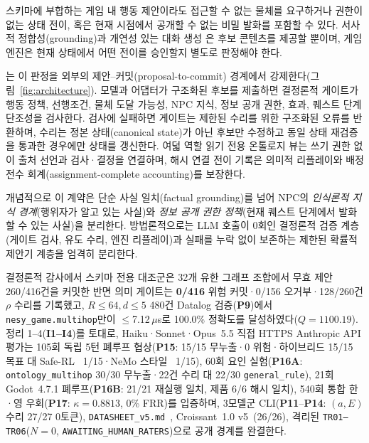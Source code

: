 스키마에 부합하는 게임 내 행동 제안이라도 접근할 수 없는 물체를 요구하거나 권한이 없는 상태 전이, 혹은 현재 시점에서 공개할 수 없는 비밀 발화를 포함할 수 있다. 서사적 정합성(grounding)과 개연성 있는 대화 생성 \cite{S03_weir2024ontologically,S20_ashby2023personalized}은 후보 콘텐츠를 제공할 뿐이며, 게임 엔진은 현재 상태에서 어떤 전이를 승인할지 별도로 판정해야 한다.

\system{}는 이 판정을 외부의 제안--커밋(proposal-to-commit) 경계에서 강제한다(그림~\ref{fig:architecture}). 모델과 어댑터가 구조화된 후보를 제출하면 결정론적 게이트가 행동 정책, 선행조건, 물체 도달 가능성, NPC 지식, 정보 공개 권한, 효과, 퀘스트 단계 단조성을 검사한다. 검사에 실패하면 게이트는 제한된 수리를 위한 구조화된 오류를 반환하며, 수리는 정본 상태(canonical state)가 아닌 후보만 수정하고 동일 상태 재검증을 통과한 경우에만 상태를 갱신한다. 여덟 역할 읽기 전용 온톨로지 뷰는 쓰기 권한 없이 출처 선언과 검사·결정을 연결하며, 해시 연결 전이 기록은 의미적 리플레이와 배정 전수 회계(assignment-complete accounting)를 보장한다.

개념적으로 이 계약은 단순 사실 일치(factual grounding)를 넘어 NPC의 \emph{인식론적 지식 경계}(행위자가 알고 있는 사실)와 \emph{정보 공개 권한 정책}(현재 퀘스트 단계에서 발화할 수 있는 사실)을 분리한다. 방법론적으로는 LLM 호출이 0회인 결정론적 검증 계층(게이트 검사, 유도 수리, 엔진 리플레이)과 실패를 누락 없이 보존하는 제한된 확률적 제안기 계층을 엄격히 분리한다.

결정론적 감사에서 스키마 전용 대조군은 32개 유한 그래프 조합에서 무효 제안 260/416건을 커밋한 반면 의미 게이트는 \textbf{0/416} 위험 커밋·0/156 오거부·128/260건 $\rho$ 수리를 기록했고, $R{\le}64, d{\le}5$ 480건 Datalog 검증(\textbf{P9})에서 \texttt{nesy\_game.multihop}만이 $\le$7.12\,$\mu$s로 100.0\% 정확도를 달성하였다($Q{=}1100.19$). 정리 1--4(\textbf{I1--I4})를 토대로, Haiku·Sonnet·Opus~5.5 직접 HTTPS Anthropic API 평가는 105회 독립 5턴 폐루프 협상(\textbf{P15}: 15/15 무누출·0 위험·하이브리드 15/15 목표 대 Safe-RL~\cite{alshiekh2018shield} 1/15·NeMo 스타일~\cite{rebedea2023nemo} 1/15), 60회 요인 실험(\textbf{P16A}: \texttt{ontology\_multihop} 30/30 무누출·22건 수리 대 22/30 \texttt{general\_rule}), 21회 Godot~4.7.1 폐루프(\textbf{P16B}: 21/21 재실행 일치, 제품 6/6 해시 일치), 540회 통합 한·영 우회(\textbf{P17}: $\kappa{=}0.8813$, 0\% FRR)를 입증하며, 3모델군 CLI(\textbf{P11}--\textbf{P14}: $(a,E)$ 수리 27/27 0토큰), \texttt{DATASHEET\_v5.md}~\cite{gebru2021datasheets}, Croissant~1.0 v5~\cite{akhtar2024croissant}(26/26), 격리된 \texttt{TR01--TR06}($N{=}0$, \texttt{AWAITING\_HUMAN\_RATERS})으로 공개 경계를 완결한다.

